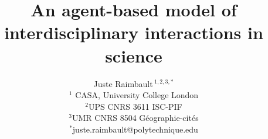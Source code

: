 \documentclass[utf8]{frontiersFPHY} %
\makeatletter
\def\firstAuthorLast{Raimbault} %
\def\Authors{Juste Raimbault\,$^{1,2,3,\ast}$}
\def\Address{$^{1}$ CASA, University College London\\%
$^{2}$UPS CNRS 3611 ISC-PIF\\%
$^{3}$UMR CNRS 8504 G{\'e}ographie-cit{\'e}s}
\def\corrEmail{$^{\ast}$juste.raimbault@polytechnique.edu}
\makeatother
\begin{document}
\onecolumn
{}

\title[Agent-based modeling interdisciplinarity]{An agent-based model of interdisciplinary interactions in science} 


\author[\firstAuthorLast ]{
\Authors\medskip\\
\Address\medskip\\
\corrEmail
} %
\address{} %
\correspondance{} %

\extraAuth{}%

\maketitle
\end{document}
